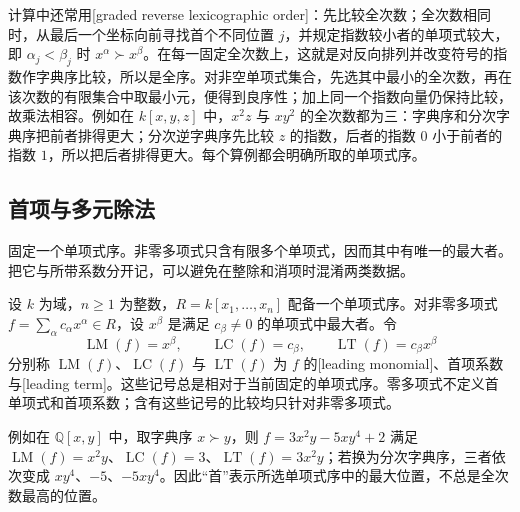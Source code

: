 \ProseParagraphBreak
计算中还常用[graded reverse lexicographic order]：先比较全次数；全次数相同时，从最后一个坐标向前寻找首个不同位置 \(j\)，并规定指数较小者的单项式较大，即 \(\alpha_j<\beta_j\) 时 \(x^\alpha\succ x^\beta\)。在每一固定全次数上，这就是对反向排列并改变符号的指数作字典序比较，所以是全序。对非空单项式集合，先选其中最小的全次数，再在该次数的有限集合中取最小元，便得到良序性；加上同一个指数向量仍保持比较，故乘法相容。例如在 \(k[x,y,z]\) 中，\(x^2z\) 与 \(xy^2\) 的全次数都为三：字典序和分次字典序把前者排得更大；分次逆字典序先比较 \(z\) 的指数，后者的指数 \(0\) 小于前者的指数 \(1\)，所以把后者排得更大。每个算例都会明确所取的单项式序。

\subsection{首项与多元除法}
\label{b1:subsec:F01:02}

固定一个单项式序。非零多项式只含有限多个单项式，因而其中有唯一的最大者。把它与所带系数分开记，可以避免在整除和消项时混淆两类数据。

\begin{definition}\label{b1:def:F-leading-data}
	设 \(k\) 为域，\(n\geq1\) 为整数，\(R=k[x_1,\ldots,x_n]\) 配备一个单项式序。对非零多项式 \(f=\sum_\alpha c_\alpha x^\alpha\in R\)，设 \(x^\beta\) 是满足 \(c_\beta\ne0\) 的单项式中最大者。令
	\[
		\operatorname{LM}(f)=x^\beta,\qquad \operatorname{LC}(f)=c_\beta,\qquad \operatorname{LT}(f)=c_\beta x^\beta
	\]
	分别称 \(\operatorname{LM}(f)\)、\(\operatorname{LC}(f)\) 与 \(\operatorname{LT}(f)\) 为 \(f\) 的[leading monomial]、首项系数与[leading term]。这些记号总是相对于当前固定的单项式序。零多项式不定义首单项式和首项系数；含有这些记号的比较均只针对非零多项式。
\end{definition}


例如在 \(\mathbb Q[x,y]\) 中，取字典序 \(x\succ y\)，则 \(f=3x^2y-5xy^4+2\) 满足 \(\operatorname{LM}(f)=x^2y\)、\(\operatorname{LC}(f)=3\)、\(\operatorname{LT}(f)=3x^2y\)；若换为分次字典序，三者依次变成 \(xy^4\)、\(-5\)、\(-5xy^4\)。因此“首”表示所选单项式序中的最大位置，不总是全次数最高的位置。

